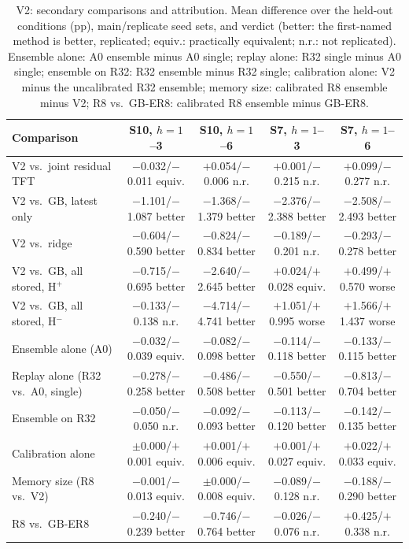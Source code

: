 \documentclass[conference]{IEEEtran}
\begin{document}
\begin{table}[t]
  \centering
  \caption{V2: secondary comparisons and attribution. Mean difference over the held-out conditions (pp),
    main/replicate seed sets, and verdict (better: the first-named method is better, replicated; equiv.: practically
    equivalent; n.r.: not replicated). Ensemble alone: A0 ensemble minus A0 single; replay alone: R32 single minus A0
    single; ensemble on R32: R32 ensemble minus R32 single; calibration alone: V2 minus the uncalibrated R32 ensemble;
    memory size: calibrated R8 ensemble minus V2; R8 vs.\ GB-ER8: calibrated R8 ensemble minus GB-ER8.}
  \label{tab:d38_secondary}
  \setlength{\tabcolsep}{3pt}
  \scriptsize
  \begin{tabular}{lcccc}
    \toprule
    Comparison & S10, $h{=}1$--3 & S10, $h{=}1$--6 & S7, $h{=}1$--3 & S7, $h{=}1$--6 \\
    \midrule
    V2 vs.\ joint residual TFT & $-$0.032/$-$0.011 equiv. & $+$0.054/$-$0.006 n.r. & $+$0.001/$-$0.215 n.r. & $+$0.099/$-$0.277 n.r. \\
    V2 vs.\ GB, latest only & $-$1.101/$-$1.087 better & $-$1.368/$-$1.379 better & $-$2.376/$-$2.388 better & $-$2.508/$-$2.493 better \\
    V2 vs.\ ridge & $-$0.604/$-$0.590 better & $-$0.824/$-$0.834 better & $-$0.189/$-$0.201 n.r. & $-$0.293/$-$0.278 better \\
    V2 vs.\ GB, all stored, H$^+$ & $-$0.715/$-$0.695 better & $-$2.640/$-$2.645 better & $+$0.024/$+$0.028 equiv. & $+$0.499/$+$0.570 worse \\
    V2 vs.\ GB, all stored, H$^-$ & $-$0.133/$-$0.138 n.r. & $-$4.714/$-$4.741 better & $+$1.051/$+$0.995 worse & $+$1.566/$+$1.437 worse \\
    Ensemble alone (A0) & $-$0.032/$-$0.039 equiv. & $-$0.082/$-$0.098 better & $-$0.114/$-$0.118 better & $-$0.133/$-$0.115 better \\
    Replay alone (R32 vs.\ A0, single) & $-$0.278/$-$0.258 better & $-$0.486/$-$0.508 better & $-$0.550/$-$0.501 better & $-$0.813/$-$0.704 better \\
    Ensemble on R32 & $-$0.050/$-$0.050 n.r. & $-$0.092/$-$0.093 better & $-$0.113/$-$0.120 better & $-$0.142/$-$0.135 better \\
    Calibration alone & $\pm$0.000/$+$0.001 equiv. & $+$0.001/$+$0.006 equiv. & $+$0.001/$+$0.027 equiv. & $+$0.022/$+$0.033 equiv. \\
    Memory size (R8 vs.\ V2) & $-$0.001/$-$0.013 equiv. & $\pm$0.000/$-$0.008 equiv. & $-$0.089/$-$0.128 n.r. & $-$0.188/$-$0.290 better \\
    R8 vs.\ GB-ER8 & $-$0.240/$-$0.239 better & $-$0.746/$-$0.764 better & $-$0.026/$-$0.076 n.r. & $+$0.425/$+$0.338 n.r. \\
    \bottomrule
  \end{tabular}
\end{table}
\end{document}
